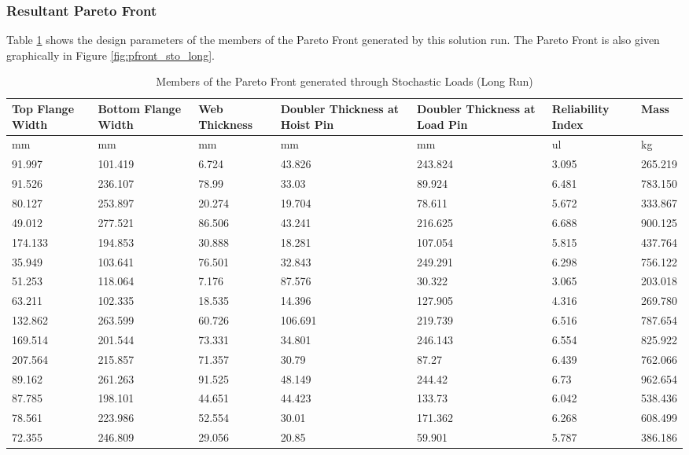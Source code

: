 \subsubsection{Resultant Pareto Front}
Table \ref{tab:pfront_sto_long} shows the design parameters of the members of the Pareto Front generated by this solution run. The Pareto Front is also given graphically in Figure \ref{fig:pfront_sto_long}. 
\begin{table}[!htbp]
\centering
\small
\begin{tabular}{|p{1.5cm}p{1.5cm}p{1.4cm}p{2cm}p{2cm}p{1.5cm}p{1.5cm}|}
\hline
Top Flange Width&Bottom Flange Width&Web Thickness&Doubler Thickness at Hoist Pin&Doubler Thickness at Load Pin&Reliability Index& Mass\\
\hline
mm&mm&mm&mm&mm&ul&kg\\
\hline
91.997&101.419&6.724&43.826&243.824&3.095&265.219\\
91.526&236.107&78.99&33.03&89.924&6.481&783.150\\
80.127&253.897&20.274&19.704&78.611&5.672&333.867\\
49.012&277.521&86.506&43.241&216.625&6.688&900.125\\
174.133&194.853&30.888&18.281&107.054&5.815&437.764\\
35.949&103.641&76.501&32.843&249.291&6.298&756.122\\
51.253&118.064&7.176&87.576&30.322&3.065&203.018\\
63.211&102.335&18.535&14.396&127.905&4.316&269.780\\
132.862&263.599&60.726&106.691&219.739&6.516&787.654\\
169.514&201.544&73.331&34.801&246.143&6.554&825.922\\
207.564&215.857&71.357&30.79&87.27&6.439&762.066\\
89.162&261.263&91.525&48.149&244.42&6.73&962.654\\
87.785&198.101&44.651&44.423&133.73&6.042&538.436\\
78.561&223.986&52.554&30.01&171.362&6.268&608.499\\
72.355&246.809&29.056&20.85&59.901&5.787&386.186\\
\hline
\end{tabular}
	\caption{Members of the Pareto Front generated through Stochastic Loads (Long Run)}
\label{tab:pfront_sto_long}
\end{table}

